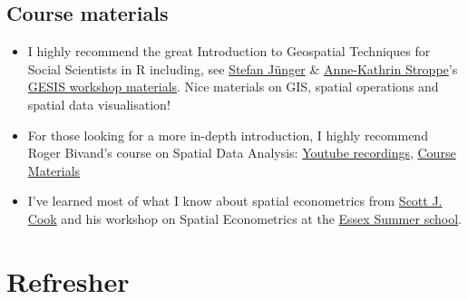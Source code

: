 \documentclass[
  letterpaper,
]{scrbook}
\begin{document}
\hypertarget{course-materials}{%
\section*{Course materials}\label{course-materials}}


\begin{itemize}
\item
  I highly recommend the great Introduction to Geospatial Techniques for
  Social Scientists in R including, see
  \href{https://stefanjuenger.github.io/}{Stefan Jünger} \&
  \href{https://www.gesis.org/institut/mitarbeitendenverzeichnis/person/Anne-Kathrin.Stroppe}{Anne-Kathrin
  Stroppe}'s
  \href{https://github.com/StefanJuenger/gesis-workshop-geospatial-techniques-R-2023}{GESIS
  workshop materials}. Nice materials on GIS, spatial operations and
  spatial data visualisation!
\item
  For those looking for a more in-depth introduction, I highly recommend
  Roger Bivand's course on Spatial Data Analysis:
  \href{https://www.youtube.com/watch?v=KkIbg50Pa0I\&list=PLXUoTpMa_9s10NVk4dBQljNOaOXAOhcE0}{Youtube
  recordings}, \href{https://rsbivand.github.io/ECS530_h19/}{Course
  Materials}
\item
  I've learned most of what I know about spatial econometrics from
  \href{http://www.scottjcook.net/}{Scott J. Cook} and his workshop on
  Spatial Econometrics at the
  \href{https://essexsummerschool.com/summer-school-facts/courses/ess-2023-course-list/}{Essex
  Summer school}.
\end{itemize}


\hypertarget{refresher}{%
\chapter{Refresher}\label{refresher}}

\newcommand{\tr}{\mathrm{tr}}
\newcommand{\rank}{\mathrm{rank}}
\newcommand{\plim}{\operatornamewithlimits{plim}}
\newcommand{\diag}{\mathrm{diag}}
\newcommand{\bm}[1]{\boldsymbol{\mathbf{#1}}}
\newcommand{\Var}{\mathrm{Var}}
\newcommand{\Exp}{\mathrm{E}}
\newcommand{\Cov}{\mathrm{Cov}}
\newcommand\given[1][]{\:#1\vert\:}
\newcommand{\irow}[1]{%
\begin{pmatrix}#1\end{pmatrix}
}
\end{document}
